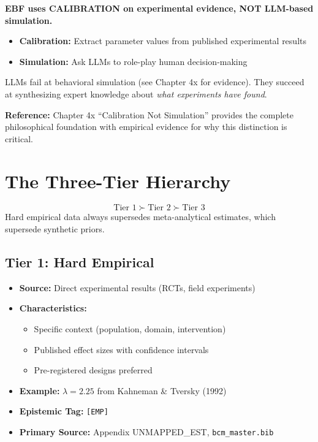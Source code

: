 \begin{tcolorbox}[colback=red!5!white, colframe=red!75!black, title=Fundamental Distinction]
\textbf{EBF uses CALIBRATION on experimental evidence, NOT LLM-based simulation.}

\begin{itemize}[nosep]
    \item \textbf{Calibration:} Extract parameter values from published experimental results
    \item \textbf{Simulation:} Ask LLMs to role-play human decision-making
\end{itemize}

LLMs fail at behavioral simulation (see Chapter 4x for evidence). They succeed at synthesizing expert knowledge about \textit{what experiments have found}.
\end{tcolorbox}

\textbf{Reference:} Chapter 4x ``Calibration Not Simulation'' provides the complete philosophical foundation with empirical evidence for why this distinction is critical.


\section{The Three-Tier Hierarchy}
\label{sec:pm-hierarchy}

\begin{tcolorbox}[colback=green!5!white, colframe=green!75!black, title=BBB Axiom UNMAPPED_BBB-1: Evidential Precedence]
$$\text{Tier 1} \succ \text{Tier 2} \succ \text{Tier 3}$$
Hard empirical data always supersedes meta-analytical estimates, which supersede synthetic priors.
\end{tcolorbox}

\subsection{Tier 1: Hard Empirical}

\begin{itemize}[nosep]
    \item \textbf{Source:} Direct experimental results (RCTs, field experiments)
    \item \textbf{Characteristics:}
        \begin{itemize}[nosep]
            \item Specific context (population, domain, intervention)
            \item Published effect sizes with confidence intervals
            \item Pre-registered designs preferred
        \end{itemize}
    \item \textbf{Example:} $\lambda = 2.25$ from Kahneman \& Tversky (1992)
    \item \textbf{Epistemic Tag:} \texttt{[EMP]}
    \item \textbf{Primary Source:} Appendix UNMAPPED_EST, \texttt{bcm\_master.bib}
\end{itemize}

